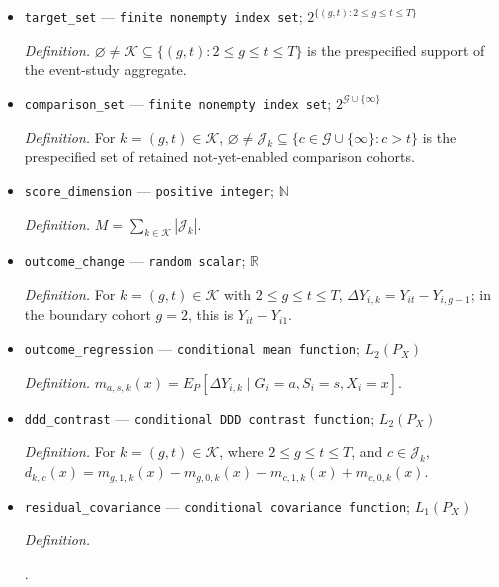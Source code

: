\documentclass{article}
\begin{document}
\begin{itemize}
  \item \texttt{target\_\allowbreak{}set} --- \texttt{finite nonempty index set}; \(2^{\{(g,t):2\le g\le t\le T\}}\)
  \par\smallskip\noindent\emph{Definition.} \(\varnothing\ne\mathcal K\subseteq\{(g,t):2\le g\le t\le T\}\) is the prespecified support of the event-study aggregate.
  \item \texttt{comparison\_\allowbreak{}set} --- \texttt{finite nonempty index set}; \(2^{\mathcal G\cup\{\infty\}}\)
  \par\smallskip\noindent\emph{Definition.} For \(k=(g,t)\in\mathcal K\), \(\varnothing\ne\mathcal J_k\subseteq\{c\in\mathcal G\cup\{\infty\}:c>t\}\) is the prespecified set of retained not-yet-enabled comparison cohorts.
  \item \texttt{score\_\allowbreak{}dimension} --- \texttt{positive integer}; \(\mathbb N\)
  \par\smallskip\noindent\emph{Definition.} \(M=\sum_{k\in\mathcal K}|\mathcal J_k|\).
  \item \texttt{outcome\_\allowbreak{}change} --- \texttt{random scalar}; \(\mathbb R\)
  \par\smallskip\noindent\emph{Definition.} For \(k=(g,t)\in\mathcal K\) with \(2\le g\le t\le T\), \(\Delta Y_{i,k}=Y_{it}-Y_{i,g-1}\); in the boundary cohort \(g=2\), this is \(Y_{it}-Y_{i1}\).
  \item \texttt{outcome\_\allowbreak{}regression} --- \texttt{conditional mean function}; \(L_2(P_X)\)
  \par\smallskip\noindent\emph{Definition.} \(m_{a,s,k}(x)=E_P[\Delta Y_{i,k}\mid G_i=a,S_i=s,X_i=x]\).
  \item \texttt{ddd\_\allowbreak{}contrast} --- \texttt{conditional DDD contrast function}; \(L_2(P_X)\)
  \par\smallskip\noindent\emph{Definition.} For \(k=(g,t)\in\mathcal K\), where \(2\le g\le t\le T\), and \(c\in\mathcal J_k\), \(d_{k,c}(x)=m_{g,1,k}(x)-m_{g,0,k}(x)-m_{c,1,k}(x)+m_{c,0,k}(x)\).
  \item \texttt{residual\_\allowbreak{}covariance} --- \texttt{conditional covariance function}; \(L_1(P_X)\)
  \par\smallskip\noindent\emph{Definition.} \leavevmode\par\noindent {}\par\noindent.

\end{itemize}
\end{document}
